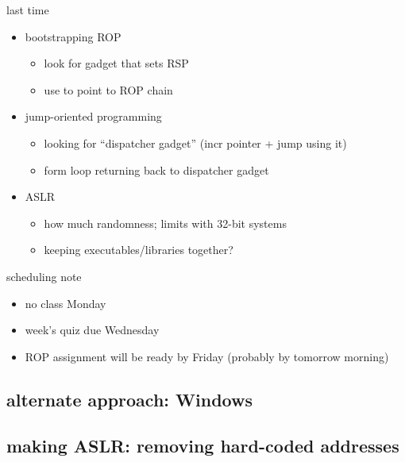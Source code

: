 \graphicspath{{./figures/}}
\title{}
\date{}

\begin{frame}
    \titlepage
\end{frame}

\begin{frame}{last time}
    \begin{itemize}
    \item bootstrapping ROP
        \begin{itemize}
        \item look for gadget that sets RSP
        \item use to point to ROP chain
        \end{itemize}
    \item jump-oriented programming
        \begin{itemize}
        \item looking for ``dispatcher gadget'' (incr pointer + jump using it)
        \item form loop returning back to dispatcher gadget
        \end{itemize}
    \item ASLR
        \begin{itemize}
        \item how much randomness; limits with 32-bit systems
        \item keeping executables/libraries together?
        \end{itemize}
    \end{itemize}
\end{frame}

\begin{frame}{scheduling note}
    \begin{itemize}
    \item no class Monday
    \item week's quiz due Wednesday
    \item ROP assignment will be ready by Friday (probably by tomorrow morning)
    \end{itemize}
\end{frame}



\subsection{alternate approach: Windows}


\subsection{making ASLR: removing hard-coded addresses}


